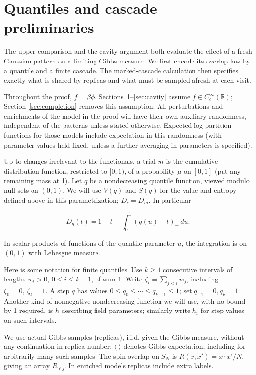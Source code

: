 \documentclass[11pt]{article}
\begin{document}
\section{Quantiles and cascade preliminaries}\label{sec:prelim}

The upper comparison and the cavity argument both evaluate the effect of a fresh Gaussian pattern on a limiting Gibbs measure. We first encode its overlap law by a quantile and a finite cascade. The marked-cascade calculation then specifies exactly what is shared by replicas and what must be sampled afresh at each visit.

Throughout the proof, $f=\beta\phi$. Sections~\ref{sec:prelim}--\ref{sec:cavity} assume $f\in C_c^\infty(\mathbb R)$; Section~\ref{sec:completion} removes this assumption. All perturbations and enrichments of the model in the proof will have their own auxiliary randomness, independent of the patterns unless stated otherwise. Expected log-partition functions for those models include expectation in this randomness (with parameter values held fixed, unless a further averaging in parameters is specified).

Up to changes irrelevant to the functionals, a trial $m$ is the cumulative distribution function, restricted to $[0,1)$, of a probability $\mu$ on $[0,1]$ (put any remaining mass at 1). Let $q$ be a nondecreasing quantile function, viewed modulo null sets on $(0,1)$. We will use $V(q)$ and $S(q)$ for the value and entropy defined above in this parametrization; $D_q=D_m$. In particular

\begin{equation*}
D_q(t)=1-t-\int_0^1(q(u)-t)_+\,du.
\end{equation*}

In scalar products of functions of the quantile parameter $u$, the integration is on $(0,1)$ with Lebesgue measure.

Here is some notation for finite quantiles. Use $k\ge1$ consecutive intervals of lengths $w_i>0$, $0\le i\le k-1$, of sum 1. Write $\zeta_i=\sum_{j<i}w_j$, including $\zeta_0=0,\ \zeta_k=1$. A step $q$ has values $0\le q_0\le\cdots\le q_{k-1}\le1$; set $q_{-1}=0, q_k=1$. Another kind of nonnegative nondecreasing function we will use, with no bound by 1 required, is $h$ describing field parameters; similarly write $h_i$ for step values on such intervals.

We use actual Gibbs samples (replicas), i.i.d. given the Gibbs measure, without any continuation in replica number; $\langle\ \rangle$ denotes Gibbs expectation, including for arbitrarily many such samples. The spin overlap on $S_N$ is $R(x,x')=x\cdot x'/N$, giving an array $R_{\ell j}$. In enriched models replicas include extra labels.
\end{document}
